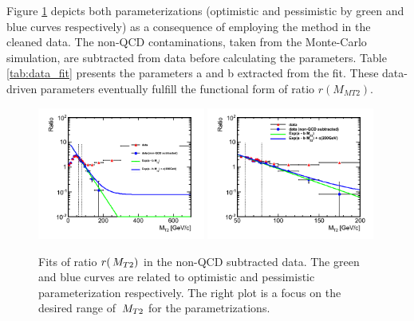 Figure \ref{fig:data_ratio} depicts both parameterizations 
(optimistic and pessimistic by green and blue curves respectively) 
as a consequence of employing the method in the cleaned data.
The non-QCD contaminations, taken from the Monte-Carlo simulation, are subtracted from 
data before calculating the parameters.
Table \ref{tab:data_fit} presents the parameters a and b extracted from the fit. 
These data-driven parameters eventually fulfill the functional form of ratio $r(M_{MT2})$.

\begin{linenomath}
\begin{figure}[h]
\centering
\includegraphics[width=0.49\textwidth,keepaspectratio=true]{QCDFig/data_ratio.png}
\includegraphics[width=0.49\textwidth,keepaspectratio=true]{QCDFig/data_ratio_zoom.png}
\caption{Fits of ratio $r(\,{M_{T2}})$ in the non-QCD subtracted data. 
The green and blue curves are related to optimistic
and pessimistic parameterization respectively. The right plot is a focus on the desired range of $\,{M_{T2}}$ for the parametrizations.} 
\label{fig:data_ratio}
\end{figure}
\end{linenomath}



